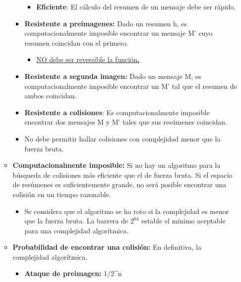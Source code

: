 \documentclass[12pt, twoside, openright]{report} %
\begin{document}
\begin{itemize}
\begin{itemize}
\begin{itemize}
\begin{itemize}
        \item \textbf{Eficiente}: El cálculo del resumen de un mensaje debe
          ser rápido.
          
        \end{itemize}
      \item \textbf{Resistente a preimagenes:} Dado un resumen h, es
        computacionalmente imposible encontrar un mensaje M' cuyo
        resumen coincidan con el primero.
        

        \begin{itemize}
        \item \underline{NO debe ser reversible la función\textbf{.}}
          
        \end{itemize}
      \item \textbf{Resistente a segunda imagen:} Dado un mensaje M, es
        computacionalmente imposible encontrar un M' tal que el resumen
        de ambos coincidan.
        
      \item \textbf{Resistente a colisiones}: Es computacionalmente
        imposible encontrar dos mensajes M y M' tales que sus resúmenes
        coincidan.
        
      \item No debe permitir hallar colisiones con complejidad menor que la
        fuerza bruta.
        
      \end{itemize}
    \item \textbf{Computacionalmente imposible:} Si no hay un algoritmo para
      la búsqueda de colisiones más eficiente que el de fuerza bruta. Si
      el espacio de resúmenes es suficientemente grande, no será posible
      encontrar una colisión en un tiempo razonable.
      

      \begin{itemize}
      \item Se considera que el algoritmo se ha roto si la complejidad es
        menor que la fuerza bruta. La barrera de $2^{64}$ estable el mínimo
        aceptable para una complejidad algorítmica.
        
      \end{itemize}
    \item \textbf{Probabilidad de encontrar una colisión:} En definitiva, la
      complejidad algorítmica.
      

      \begin{itemize}
      \item \textbf{Ataque de preimagen:} 1/2\^{}n
        

\end{itemize}
\end{itemize}
\end{itemize}
\end{document}
